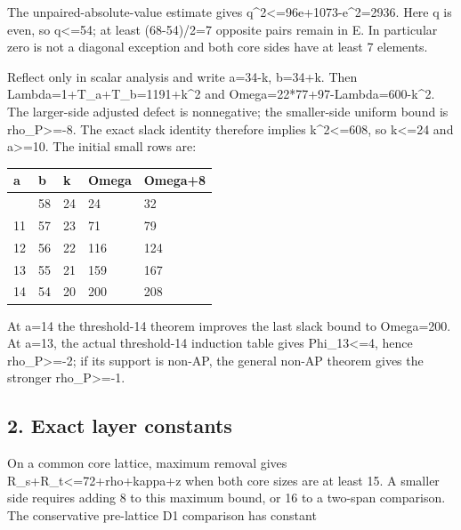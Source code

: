\documentclass[10pt,a4paper]{article}
\theoremstyle{definition}
\begin{document}
The unpaired-absolute-value estimate gives
q\^{}2\textless=\allowbreak{}96e+\allowbreak{}1073-e\^{}2=\allowbreak{}2936. Here q is even,\allowbreak{} so q\textless=\allowbreak{}54;
at least (68-54)/2=\allowbreak{}7 opposite pairs remain in E. In particular zero is
not a diagonal exception and both core sides have at least 7 elements.

Reflect only in scalar analysis and write a=\allowbreak{}34-k,\allowbreak{} b=\allowbreak{}34+\allowbreak{}k. Then
Lambda=\allowbreak{}1+\allowbreak{}T\_\allowbreak{}a+\allowbreak{}T\_\allowbreak{}b=\allowbreak{}1191+\allowbreak{}k\^{}2 and Omega=\allowbreak{}22*77+\allowbreak{}97-Lambda=\allowbreak{}600-k\^{}2. The
larger-side adjusted defect is nonnegative; the smaller-side uniform
bound is rho\_\allowbreak{}P\textgreater=\allowbreak{}-8. The exact slack identity therefore
implies k\^{}2\textless=\allowbreak{}608,\allowbreak{} so k\textless=\allowbreak{}24 and a\textgreater=\allowbreak{}10. The
initial small rows are:

\begin{longtable}[]{@{}lllll@{}}
\toprule\noalign{}
a & b & k & Omega & Omega+\allowbreak{}8 \\
\midrule\noalign{}
\endhead
\bottomrule\noalign{}
\endlastfoot
10 & 58 & 24 & 24 & 32 \\
11 & 57 & 23 & 71 & 79 \\
12 & 56 & 22 & 116 & 124 \\
13 & 55 & 21 & 159 & 167 \\
14 & 54 & 20 & 200 & 208 \\
\end{longtable}

At a=\allowbreak{}14 the threshold-14 theorem improves the last slack bound to
Omega=\allowbreak{}200. At a=\allowbreak{}13,\allowbreak{} the actual threshold-14 induction table gives
Phi\_\allowbreak{}13\textless=\allowbreak{}4,\allowbreak{} hence rho\_\allowbreak{}P\textgreater=\allowbreak{}-2; if its support is
non-AP,\allowbreak{} the general non-AP theorem gives the stronger
rho\_\allowbreak{}P\textgreater=\allowbreak{}-1.

\hypertarget{exact-layer-constants}{%
\subsection{2. Exact layer constants}\label{exact-layer-constants}}

On a common core lattice,\allowbreak{} maximum removal gives
R\_\allowbreak{}s+\allowbreak{}R\_\allowbreak{}t\textless=\allowbreak{}72+\allowbreak{}rho+\allowbreak{}kappa+\allowbreak{}z when both core sizes are at least 15.
A smaller side requires adding 8 to this maximum bound,\allowbreak{} or 16 to a
two-span comparison. The conservative pre-lattice D1 comparison has
constant
\end{document}
